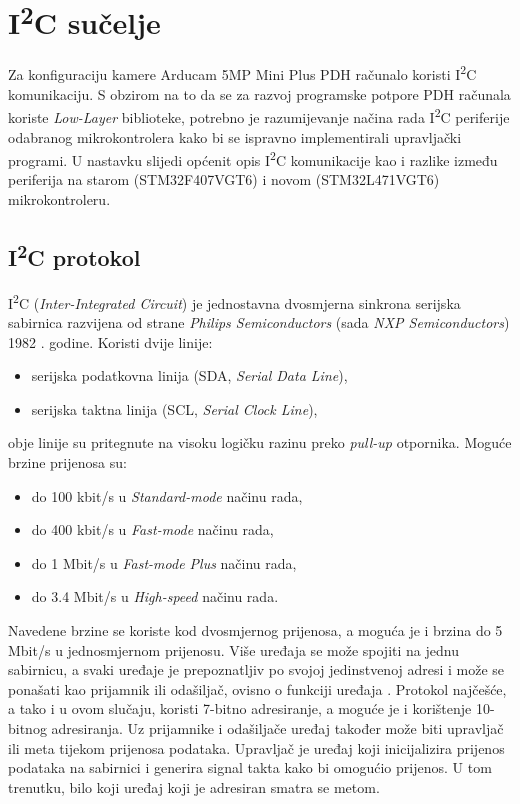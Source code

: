 \chapter{I\textsuperscript{2}C sučelje}

Za konfiguraciju kamere Arducam 5MP Mini Plus  PDH računalo koristi I\textsuperscript{2}C komunikaciju. S obzirom na to da se za razvoj programske potpore PDH računala koriste \textit{Low-Layer} biblioteke, potrebno je razumijevanje načina rada I\textsuperscript{2}C periferije odabranog mikrokontrolera kako bi se ispravno implementirali upravljački programi. U nastavku slijedi općenit opis I\textsuperscript{2}C komunikacije kao i razlike između periferija na starom (STM32F407VGT6) i novom (STM32L471VGT6) mikrokontroleru.

\section{I\textsuperscript{2}C protokol}

I\textsuperscript{2}C (\textit{Inter-Integrated Circuit}) je jednostavna dvosmjerna sinkrona serijska sabirnica razvijena od strane \textit{Philips Semiconductors} (sada \textit{NXP Semiconductors}) 1982 \cite{i2c_wikipedia}. godine. Koristi dvije linije:
\begin{itemize}
	\item serijska podatkovna linija (SDA, \textit{Serial Data Line}),
	\item serijska taktna linija (SCL, \textit{Serial Clock Line}),
\end{itemize}
obje linije su pritegnute na visoku logičku razinu preko \textit{pull-up} otpornika. Moguće brzine prijenosa su:
\begin{itemize}
	\item do 100 \si{kbit/s} u \textit{Standard-mode} načinu rada, 
	\item do 400 \si{kbit/s} u \textit{Fast-mode} načinu rada,
	\item do 1 \si{Mbit/s} u \textit{Fast-mode Plus} načinu rada,
	\item do 3.4 \si{Mbit/s} u \textit{High-speed} načinu rada.
\end{itemize}
Navedene brzine se koriste kod dvosmjernog prijenosa, a moguća je i brzina do 5 \si{Mbit/s} u jednosmjernom prijenosu. Više uređaja se može spojiti na jednu sabirnicu, a svaki uređaje je prepoznatljiv po svojoj jedinstvenoj adresi i može se ponašati kao prijamnik ili odašiljač, ovisno o funkciji uređaja \cite{i2c_manual}. Protokol najčešće, a tako i u ovom slučaju, koristi 7-bitno adresiranje, a moguće je i korištenje 10-bitnog adresiranja. Uz prijamnike i odašiljače uređaj također može biti upravljač ili meta tijekom prijenosa podataka. Upravljač je uređaj koji inicijalizira prijenos podataka na sabirnici i generira signal takta kako bi omogućio prijenos. U tom trenutku, bilo koji uređaj koji je adresiran smatra se metom.

